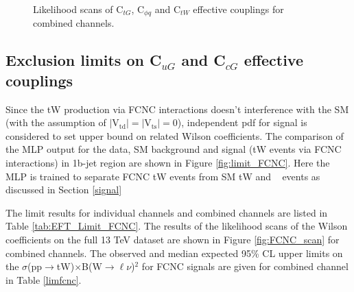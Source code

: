 \begin{figure}[ht]
\begin{center}
\begin{tabular}{cc}
    \end{tabular}
    \caption{Likelihood scans of C$_{tG}$, C$_{\phi q}$ and C$_{tW}$ effective couplings for combined channels.
    \label{fig:EFT_scan}}
  \end{center}
\end{figure}

\clearpage

\subsection {Exclusion limits on \texorpdfstring{C$_{uG}$ and C$_{cG}$  effective couplings}{}}

Since the tW production via FCNC interactions doesn't interference with the SM (with the assumption of $|\text{V}_{\text{td}}| = |\text{V}_{\text{ts}}| = 0$),
independent pdf for signal is considered  to set upper bound on related Wilson coefficients. The comparison of the MLP output for the data, SM background  and signal (tW events via FCNC interactions) in 1b-jet region are shown in Figure \ref{fig:limit_FCNC}. Here the MLP is trained to separate FCNC tW events from SM tW and \ttbar~ events as discussed in Section \ref{signal}

The limit results for individual channels and combined channels are listed in Table \ref{tab:EFT_Limit_FCNC}.
The results of the likelihood scans of the Wilson coefficients on the full 13 TeV dataset are shown in Figure \ref{fig:FCNC_scan} for combined channels.
The observed and median expected 95\% CL upper limits on the  $\sigma$(pp$\rightarrow$tW)$\times$B(W$\rightarrow \ell\nu$)$^2$ for FCNC signals are given for combined channel in Table \ref{limfcnc}.

